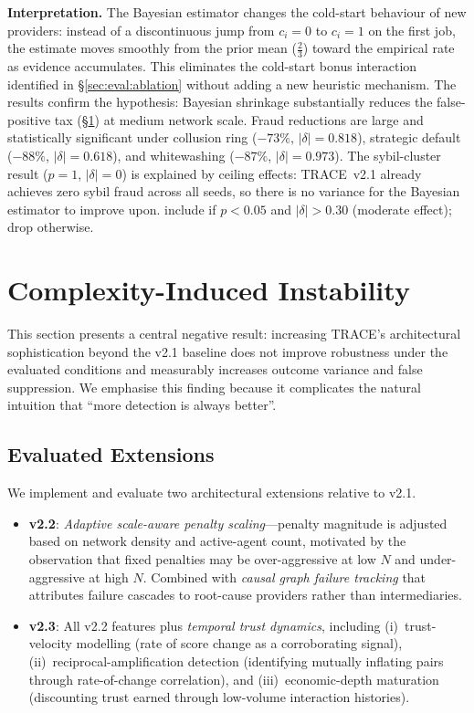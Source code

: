 \documentclass[sigconf,nonacm,10pt]{acmart}
\begin{document}
\noindent\textbf{Interpretation.}
The Bayesian estimator changes the cold-start behaviour of
new providers: instead of a discontinuous jump from $c_i = 0$ to
$c_i = 1$ on the first job, the estimate moves smoothly from the prior
mean ($\tfrac{2}{3}$) toward the empirical rate as evidence accumulates.
This eliminates the cold-start bonus interaction identified in
\S\ref{sec:eval:ablation} without adding a new heuristic mechanism.
The results confirm the hypothesis: Bayesian shrinkage substantially
reduces the false-positive tax (\S\ref{sec:complexity}) at medium
network scale. Fraud reductions are large and statistically significant
under collusion ring ($-73\%$, $|\delta|=0.818$), strategic default
($-88\%$, $|\delta|=0.618$), and whitewashing ($-87\%$, $|\delta|=0.973$).
The sybil-cluster result ($p=1$, $|\delta|=0$) is explained by ceiling
effects: TRACE~v2.1 already achieves zero sybil fraud across all seeds,
so there is no variance for the Bayesian estimator to improve upon.
include if $p < 0.05$ and $|\delta| > 0.30$ (moderate effect); drop otherwise.

\section{Complexity-Induced Instability}
\label{sec:complexity}

This section presents a central negative result: increasing
TRACE's architectural sophistication beyond the v2.1 baseline does
not improve robustness under the evaluated conditions and
measurably increases outcome variance and false suppression. We
emphasise this finding because it complicates the natural
intuition that ``more detection is always better''.

\subsection{Evaluated Extensions}

We implement and evaluate two architectural extensions relative
to v2.1.

\begin{itemize}[leftmargin=*,topsep=2pt,itemsep=2pt]
  \item \textbf{v2.2}: \emph{Adaptive scale-aware penalty
        scaling}---penalty magnitude is adjusted based on network
        density and active-agent count, motivated by the
        observation that fixed penalties may be over-aggressive at
        low $N$ and under-aggressive at high $N$. Combined with
        \emph{causal graph failure tracking} that attributes
        failure cascades to root-cause providers rather than
        intermediaries.
  \item \textbf{v2.3}: All v2.2 features plus \emph{temporal trust
        dynamics}, including (i)~trust-velocity modelling (rate of
        score change as a corroborating signal),
        (ii)~reciprocal-amplification detection (identifying
        mutually inflating pairs through rate-of-change
        correlation), and (iii)~economic-depth maturation
        (discounting trust earned through low-volume interaction
        histories).
\end{itemize}
\end{document}
